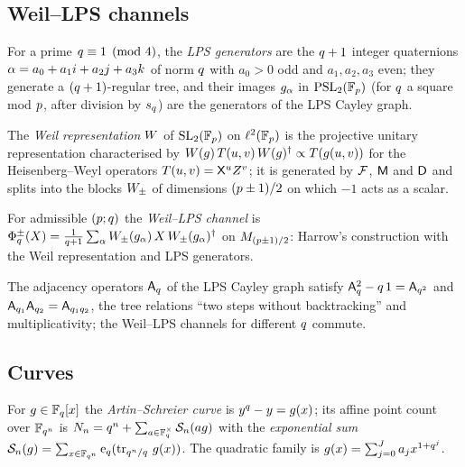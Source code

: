 \subsection{Weil--LPS channels}

\begin{definition}
\label{def:lps-generators}
For a prime $q\equiv1\pmod4$, the \emph{LPS generators} are the $q+1$
integer quaternions $\alpha = a_0+a_1i+a_2j+a_3k$ of norm $q$ with $a_0>0$
odd and $a_1,a_2,a_3$ even; they generate a $(q+1)$-regular tree, and their
images $g_{\alpha}$ in $\mathrm{PSL}_2(\mathbb F_p)$ (for $q$ a square mod $p$, after division
by $s_q$) are the generators of the LPS Cayley graph.
\end{definition}

\begin{definition}
\label{def:weil-representation}
The \emph{Weil representation} $W$ of $\mathrm{SL}_2(\mathbb F_p)$ on $\ell^2(\mathbb F_p)$ is the
projective unitary representation characterised by $W(g)\,T(u,v)\,
W(g)^\dagger\propto T(g(u,v))$ for the Heisenberg--Weyl operators
$T(u,v) = \mathsf X^uZ^v$; it is generated by $\mathcal F$, $\mathsf M$ and $\mathsf D$ and
splits into the blocks $W_{\pm}$ of dimensions $(p\pm1)/2$ on which $-1$ acts
as a scalar.
\end{definition}

\begin{definition}
\label{def:weil-lps-channel}
For admissible $(p;q)$ the \emph{Weil--LPS channel} is
$\Phi_{q}^{\pm}(X) = \frac1{q+1}\sum_{\alpha}W_{\pm}(g_{\alpha})\,X\,
W_{\pm}(g_{\alpha})^\dagger$ on $M_{(p\pm1)/2}$: Harrow's construction with the
Weil representation and LPS generators.
\end{definition}

\begin{definition}
\label{def:hecke-relation}
The adjacency operators $\mathsf A_{q}$ of the LPS Cayley graph satisfy
$\mathsf A_{q}^2 - q\,1 = \mathsf A_{q^2}$ and $\mathsf A_{q_1}\mathsf A_{q_2} =
\mathsf A_{q_1q_2}$, the tree relations ``two steps without backtracking''
and multiplicativity; the Weil--LPS channels for different $q$ commute.
\end{definition}

\subsection{Curves}

\begin{definition}
\label{def:artin-schreier}
For $g\in\mathbb F_q[x]$ the \emph{Artin--Schreier curve} is $y^{q}-y = g(x)$; its
affine point count over $\mathbb F_{q^{n}}$ is $N_{n} = q^n +
\sum_{a\in\mathbb F_q^\times}\mathcal S_{n}(ag)$ with the \emph{exponential sum}
$\mathcal S_{n}(g) = \sum_{x\in\mathbb F_{q^{n}}}\mathrm e_q(\operatorname{tr}_{q^n/q}\,g(x))$. The quadratic family
is $g(x) = \sum_{j=0}^{J}a_jx^{1+q^j}$.
\end{definition}

